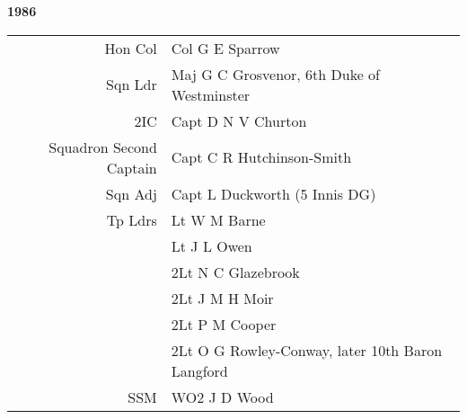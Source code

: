 \begin{center}
  \Huge
  \textbf{1986}
\end{center}

\begin{center}
  \small
  \begin{tabular}{rl}
    Hon Col & Col G E Sparrow \\
    Sqn Ldr & Maj G C Grosvenor, 6th Duke of Westminster \\
    2IC & Capt D N V Churton \\
    Squadron Second Captain & Capt C R Hutchinson-Smith \\
    Sqn Adj & Capt L Duckworth (5 Innis DG) \\
    Tp Ldrs & Lt W M Barne \\
      & Lt J L Owen \\
      & 2Lt N C Glazebrook \\
      & 2Lt J M H Moir \\
      & 2Lt P M Cooper \\
      & 2Lt O G Rowley-Conway, later 10th Baron Langford \\
    SSM & WO2 J D Wood \\
  \end{tabular}
\end{center}

